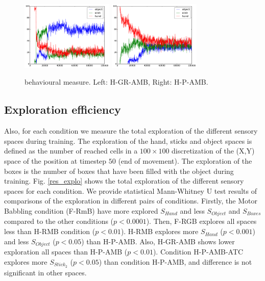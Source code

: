 \documentclass[10pt,letterpaper]{article}
\begin{document}
		\begin{figure}[ht]
			\centering
			\includegraphics[width=4.4cm]{./include/H-RGB-GR-AMB-log15-events-100000.pdf}
			\hspace{-0.4cm}
			\includegraphics[width=4.4cm]{./include/H-RGB-P-AMB-log8-events-100000.pdf}
			\caption{behavioural measure. Left: H-GR-AMB, Right: H-P-AMB.}
			\label{res_ow}
		\end{figure}
		
	
	
	\subsection{Exploration efficiency}

		Also, for each condition we measure the total exploration of the different sensory spaces during training. 
		The exploration of the hand, sticks and object spaces is defined as the number of reached cells 
		in a $100\times100$ discretization of the (X,Y) space of the position at timestep $50$ (end of movement).
		The exploration of the boxes is the number of boxes that have been filled with the object during training.
		Fig. \ref{res_explo} shows the total exploration of the different sensory spaces for each condition.
		We provide statistical Mann-Whitney U test results of comparisons of the exploration in different pairs of conditions.
		Firstly, the Motor Babbling condition (F-RmB) have more explored $S_{Hand}$ and less $S_{Object}$ and $S_{Boxes}$ compared to the other conditions ($p<0.0001$).
		Then, F-RGB explores all spaces less than H-RMB condition ($p<0.01$).
		H-RMB explores more $S_{Hand}$ ($p<0.001$) and less $S_{Object}$ ($p<0.05$) than H-P-AMB.
		Also, H-GR-AMB shows lower exploration all spaces than H-P-AMB ($p<0.01$).
		Condition H-P-AMB-ATC explores more $S_{Stick_2}$ ($p<0.05$) than condition H-P-AMB, and difference is not significant in other spaces.
		
\end{document}

